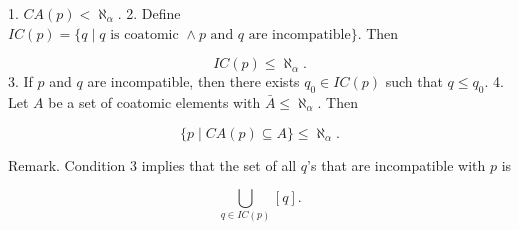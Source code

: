 1. $CA(p) < \aleph_\alpha.$
2. Define $IC(p) = \{q \mid q \text{ is coatomic } \land p \text{ and } q \text{ are incompatible}\}$. Then

$$IC(p) \leq \aleph_\alpha.$$
3. If $p$ and $q$ are incompatible, then there exists $q_0 \in IC(p)$ such that $q \leq q_0.$
4. Let $A$ be a set of coatomic elements with $\bar{A} \leq \aleph_\alpha$. Then

$$\{p \mid CA(p) \subseteq A\} \leq \aleph_\alpha.$$

Remark. Condition 3 implies that the set of all $q$'s that are incompatible with $p$ is

$$\bigcup_{q \in IC(p)} [q].$$
